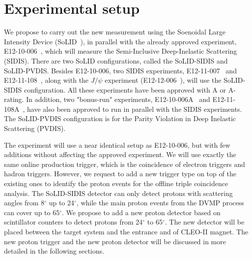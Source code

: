 \section {Experimental setup}
We propose to carry out the new measurement using the Soenoidal Large Intensity Device (SoLID~\cite{solid_pcdr}), in parallel with the already approved experiment, E12-10-006~\cite{solid:e12-10-006}, which will measure the Semi-Inclusive Deep-Inelastic Scattering (SIDIS). There are two SoLID configurations, called the SoLID-SIDIS and SoLID-PVDIS. Besides E12-10-006, two SIDIS experiments, E12-11-007~\cite{solid:e12-11-007} and E12-11-108~\cite{solid:e12-11-108}, along with the $J/\psi$ experiment (E12-12-006~\cite{solid:e12-12-006}), will use the SoLID-SIDIS configuration. All these experiments have been approved with A or A- rating. In addition, two "bonus-run" experiments, E12-10-006A~\cite{solid:e12-10-006A} and E12-11-108A~\cite{solid:e12-11-108A}, have also been approved to run in parallel with the SIDIS experiments. The SoLID-PVDIS configuration is for the Parity Violation in Deep Inelastic Scattering (PVDIS).

The experiment will use a near identical setup as E12-10-006, but with few additions without affecting the approved experiment. We will use exactly the same online production trigger, which is the coincidence of electron triggers and hadron triggers. However, we request to add a new trigger type on top of the existing ones to identify the proton events for the offline triple coincidence analysis. The SoLID-SIDIS detector can only detect protons with scattering angles from 8$^{\circ}$ up to 24$^{\circ}$, while the main proton events from the DVMP process can cover up to 65$^{\circ}$. We propose to add a new proton detector based on scintillator counters  to detect protons from  24$^{\circ}$ to  65$^{\circ}$. The new detector will be placed between the target system and the entrance and of CLEO-II magnet. The new proton trigger and the new proton detector will be discussed in more detailed in the following sections.

